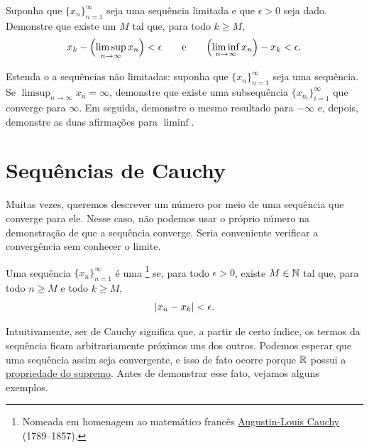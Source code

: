 \begin{exercise}
Suponha que $\{ x_n \}_{n=1}^\infty$ seja uma sequência limitada e que $\epsilon > 0$ seja dado.
Demonstre que existe um $M$ tal que, para todo $k \geq M$,
\begin{equation*}
x_k - \Bigl(\limsup_{n\to\infty} x_n\Bigr) < \epsilon \qquad \text{e} \qquad
\Bigl(\liminf_{n\to\infty} x_n\Bigr) - x_k < \epsilon .
\end{equation*}
\end{exercise}

\begin{exercise} \label{exercise:extendsubseqlimsupinf}
Estenda o  a sequências não limitadas:
suponha que $\{ x_n \}_{n=1}^\infty$ seja uma sequência.
Se $\limsup_{n\to\infty} x_n = \infty$, demonstre que
existe uma subsequência $\{ x_{n_i} \}_{i=1}^\infty$ que converge para $\infty$.
Em seguida, demonstre o mesmo resultado para $-\infty$ e, depois, demonstre as duas afirmações para
$\liminf$.
\end{exercise}



\sectionnewpage

\section{Sequências de Cauchy}
\label{sec:cauchy}


Muitas vezes, queremos descrever um número por meio de uma sequência que
converge para ele. Nesse caso, não podemos usar o próprio número na demonstração
de que a sequência converge.
Seria conveniente verificar a convergência sem conhecer o limite.

\begin{defn}
Uma sequência $\{ x_n \}_{n=1}^\infty$ é uma \emph{}%
\footnote{%
Nomeada em homenagem ao matemático francês
\href{https://en.wikipedia.org/wiki/Cauchy}{Augustin-Louis Cauchy} (1789--1857).} se, para todo $\epsilon > 0$, existe $M \in {\mathbb{N}}$ tal que,
para todo $n \geq M$ e todo $k \geq M$,
\begin{equation*}
\lvert {x_n - x_k} \rvert < \epsilon .
\end{equation*}
\end{defn}

Intuitivamente, ser de Cauchy significa que, a partir de certo índice, os termos
da sequência ficam arbitrariamente próximos uns dos outros. Podemos esperar que
uma sequência assim seja convergente, e isso de fato ocorre porque ${\mathbb{R}}$ possui a
\hyperref[defn:lub]{propriedade do supremo}. Antes de demonstrar esse fato,
vejamos alguns exemplos.

